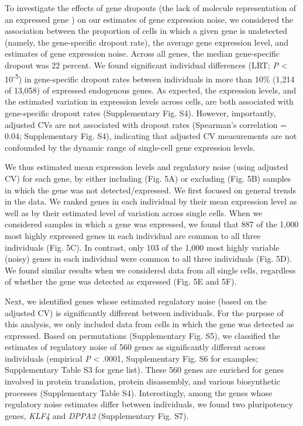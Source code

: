 To investigate the effects of gene dropouts (the lack of molecule
representation of an expressed gene \citep{Brennecke2013, Shalek2013})
on our estimates of gene expression noise, we considered the association
between the proportion of cells in which a given gene is undetected
(namely, the gene-specific dropout rate), the average gene expression
level, and estimates of gene expression noise. Across all genes, the
median gene-specific dropout was 22 percent. We found significant
individual differences (LRT; \emph{P} \textless{}
10\textsuperscript{-5}) in gene-specific dropout rates between
individuals in more than 10\% (1,214 of 13,058) of expressed endogenous
genes. As expected, the expression levels, and the estimated variation
in expression levels across cells, are both associated with
gene-specific dropout rates (Supplementary Fig. S4). However,
importantly, adjusted CVs are not associated with dropout rates
(Spearman's correlation = 0.04; Supplementary Fig. S4), indicating that
adjusted CV measurements are not confounded by the dynamic range of
single-cell gene expression levels.

We thus estimated mean expression levels and regulatory noise (using
adjusted CV) for each gene, by either including (Fig. 5A) or excluding
(Fig. 5B) samples in which the gene was not detected/expressed. We first
focused on general trends in the data. We ranked genes in each
individual by their mean expression level as well as by their estimated
level of variation across single cells. When we considered samples in
which a gene was expressed, we found that 887 of the 1,000 most highly
expressed genes in each individual are common to all three individuals
(Fig. 5C). In contrast, only 103 of the 1,000 most highly variable
(noisy) genes in each individual were common to all three individuals
(Fig. 5D). We found similar results when we considered data from all
single cells, regardless of whether the gene was detected as expressed
(Fig. 5E and 5F).

Next, we identified genes whose estimated regulatory noise (based on the
adjusted CV) is significantly different between individuals. For the
purpose of this analysis, we only included data from cells in which the
gene was detected as expressed. Based on permutations (Supplementary
Fig. S5), we classified the estimates of regulatory noise of 560 genes
as significantly different across individuals (empirical \emph{P}
\textless{} .0001, Supplementary Fig. S6 for examples; Supplementary
Table S3 for gene list). These 560 genes are enriched for genes involved
in protein translation, protein disassembly, and various biosynthetic
processes (Supplementary Table S4). Interestingly, among the genes whose
regulatory noise estimates differ between individuals, we found two
pluripotency genes, \emph{KLF4} and \emph{DPPA2} (Supplementary Fig.
S7).

